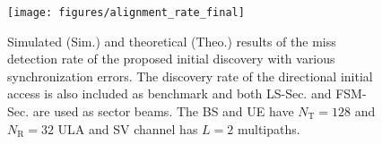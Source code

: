 \documentclass[journal]{IEEEtran}
\newcommand{\tx}[0]{\text{T}}
\newcommand{\rx}[0]{\text{R}}
\begin{document}



\begin{figure}
\begin{center}
\texttt{[image: figures/alignment\_rate\_final]}
\end{center}
\vspace{-4mm}
\caption{Simulated (Sim.) and theoretical (Theo.) results of the miss detection rate of the proposed initial discovery with various synchronization errors. The discovery rate of the directional initial access is also included as benchmark and both LS-Sec. and FSM-Sec. are used as sector beams. The BS and UE have $N_{\tx} = 128$ and $N_{\rx}=32$ ULA and SV channel has $L=2$ multipaths.}
\vspace{-4mm}
\label{fig:detection_theo_vs_sim}
\end{figure}
\end{document}
